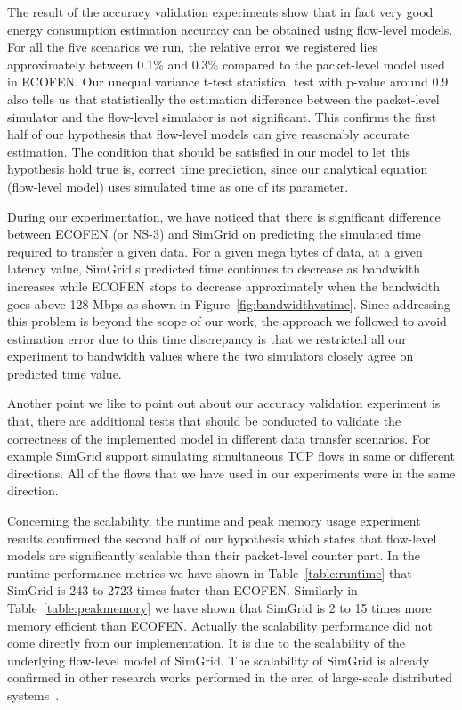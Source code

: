The result of the accuracy validation experiments show that in fact very good energy consumption estimation accuracy can be obtained using flow-level models. For all the five scenarios we run, the relative error we registered lies approximately between  0.1\% and 0.3\% compared to the packet-level model used in ECOFEN. Our unequal variance t-test statistical test with p-value around 0.9 also tells us that statistically the estimation difference between the packet-level simulator and the flow-level simulator is not significant. This confirms the first half of our hypothesis that flow-level models can give reasonably accurate estimation. The condition that should be satisfied in our model to let this hypothesis hold true is, correct time prediction, since our analytical equation (flow-level model) uses simulated time as one of its parameter. 

During our experimentation, we have noticed that there is significant difference between ECOFEN (or NS-3) and SimGrid on predicting the simulated time required to transfer a given data. For a given mega bytes of data, at a given latency value, SimGrid's predicted time continues to decrease as bandwidth increases while ECOFEN stops to decrease approximately when the bandwidth goes above 128 Mbps as shown in Figure~\ref{fig:bandwidthvstime}. Since addressing this problem is beyond the scope of our work, the approach we followed to avoid estimation error due to this time discrepancy is that we restricted all our experiment to bandwidth values where the two simulators closely agree on predicted time value.

Another point we like to point out about our accuracy validation experiment is that, there are additional tests that should be conducted to validate the correctness of the implemented model in different data transfer scenarios. For example SimGrid support simulating simultaneous TCP flows in same or different directions. All of the flows that we have used in our experiments were in the same direction. 

Concerning the scalability, the runtime and peak memory usage experiment results confirmed the second half of our hypothesis which states that flow-level models are significantly scalable than their packet-level counter part. In the runtime performance metrics we have shown in Table~\ref{table:runtime} that SimGrid is 243 to 2723 times faster than ECOFEN. Similarly in Table~\ref{table:peakmemory} we have shown that SimGrid is 2 to 15 times more memory efficient than ECOFEN. Actually the scalability performance did not come directly from our implementation. It is due to the scalability of the underlying flow-level model of SimGrid. The scalability of SimGrid is already confirmed in other research works performed in the area of large-scale distributed systems~\cite{DBLP:conf/ccgrid/QuinsonRT12,DBLP:journals/jpdc/CasanovaGLQS14}.

